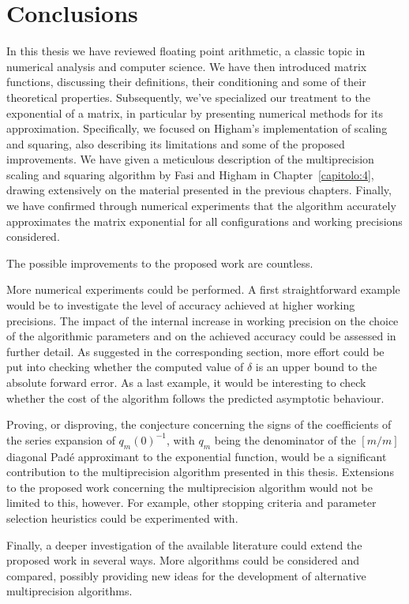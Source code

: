 \chapter*{Conclusions}
In this thesis we have reviewed floating point arithmetic, a classic topic in numerical analysis and computer science. We have then introduced matrix functions, discussing their definitions, their conditioning and some of their theoretical properties. Subsequently, we've specialized our treatment to the exponential of a matrix, in particular by presenting numerical methods for its approximation. Specifically, we focused on Higham's implementation of scaling and squaring, also describing its limitations and some of the proposed improvements. We have given a meticulous description of the multiprecision scaling and squaring algorithm by Fasi and Higham in Chapter~\ref{capitolo:4}, drawing extensively on the material presented in the previous chapters. Finally, we have confirmed through numerical experiments that the algorithm accurately approximates the matrix exponential for all configurations and working precisions considered. 
\smallskip 

The possible improvements to the proposed work are countless. 

More numerical experiments could be performed. A first straightforward example would be to investigate the level of accuracy achieved at higher working precisions. The impact of the internal increase in working precision on the choice of the algorithmic parameters and on the achieved accuracy could be assessed in further detail. As suggested in the corresponding section, more effort could be put into checking whether the computed value of $\delta$ is an upper bound to the absolute forward error. As a last example, it would be interesting to check whether the cost of the algorithm follows the predicted asymptotic behaviour.

Proving, or disproving, the conjecture concerning the signs of the coefficients of the series expansion of $q_m(0)^{-1}$, with $q_m$ being the denominator of the $[m/m]$ diagonal Padé approximant to the exponential function, would be a significant contribution to the multiprecision algorithm presented in this thesis.  
Extensions to the proposed work concerning the multiprecision algorithm would not be limited to this, however. For example, other stopping criteria and parameter selection heuristics could be experimented with.

Finally, a deeper investigation of the available literature could extend the proposed work in several ways. More algorithms could be considered and compared, possibly providing new ideas for the development of alternative multiprecision algorithms.





